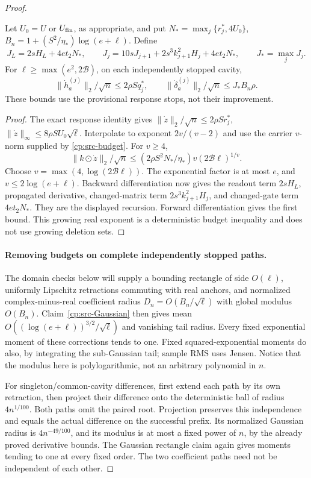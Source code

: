 \begin{proof}
\begin{claim}
\label{cp:src-time-derivative}
Let \(U_0=U\) or \(U_{\rm fin}\), as appropriate, and put
\(N_* =\max_j\{r_j^*,4U_0\}\),
\(B_n=1+(S^2/\eta_*)\log(e+\ell)\).  Define
\[
 J_L=2sH_L+4et_2N_*,\qquad
 J_j=10sJ_{j+1}+2s^3k_{j+1}^2H_j+4et_2N_*,\qquad J_* =\max_jJ_j.
\]
For \(\ell\ge\max(e^2,2\mathcal B)\), on each independently
stopped cavity,
\[
 \|\dot h_a^{(j)}\|_2/\sqrt n\le2\rho Sq_j^*,\qquad
 \|\dot\delta_a^{(j)}\|_2/\sqrt n\le J_*B_n\rho.
\]
These bounds use the provisional response stops, not their improvement.
\end{claim}
\begin{proof}
The exact response identity gives
\(\|\dot z\|_2/\sqrt n\le2\rho Sr_j^*\),
\(\|\dot z\|_\infty\le8\rho SU_0\sqrt\ell\).
Interpolate to exponent \(2v/(v-2)\) and use the carrier
\(v\)-norm supplied by \eqref{cp:src-budget}.  For \(v\ge4\),
\[
 \|k\odot\dot z\|_2/\sqrt n
 \le(2\rho S^2N_*/\eta_*)v(2\mathcal B\ell)^{1/v}.
\]
Choose \(v=\max(4,\log(2\mathcal B\ell))\).  The exponential
factor is at most \(e\), and \(v\le2\log(e+\ell)\).
Backward differentiation now gives the readout term \(2sH_L\),
propagated derivative, changed-matrix term
\(2s^3k_{j+1}^2H_j\), and changed-gate term \(4et_2N_*\).
They are the displayed recursion.  Forward differentiation gives the
first bound.  This growing real exponent is a deterministic budget
inequality and does not use growing deletion sets.
\end{proof}

\paragraph{Removing budgets on complete independently stopped paths.}
The domain checks below will supply a bounding rectangle of side
\(O(\ell)\), uniformly Lipschitz retractions commuting with real
anchors, and normalized complex-minus-real coefficient radius
\(D_n=O(B_n/\sqrt\ell)\) with global modulus \(O(B_n)\).
Claim~\ref{cp:src-Gaussian} then gives mean
\(O((\log(e+\ell))^{3/2}/\sqrt\ell)\) and vanishing tail radius.
Every fixed exponential moment of these corrections tends to one.
Fixed squared-exponential moments do also, by integrating the
sub-Gaussian tail; sample RMS uses Jensen.  Notice that the modulus
here is polylogarithmic, not an arbitrary polynomial in \(n\).

For singleton/common-cavity differences, first extend each path by
its own retraction, then project their difference onto the deterministic
ball of radius \(4n^{1/100}\).  Both paths omit the paired root.
Projection preserves this independence and equals the actual difference
on the successful prefix.  Its normalized Gaussian radius is
\(4n^{-49/100}\), and its modulus is at most a fixed power of
\(n\), by the already proved derivative bounds.  The Gaussian
rectangle claim again gives moments tending to one at every fixed
order.  The two coefficient paths need not be independent of each other.


\end{proof}
